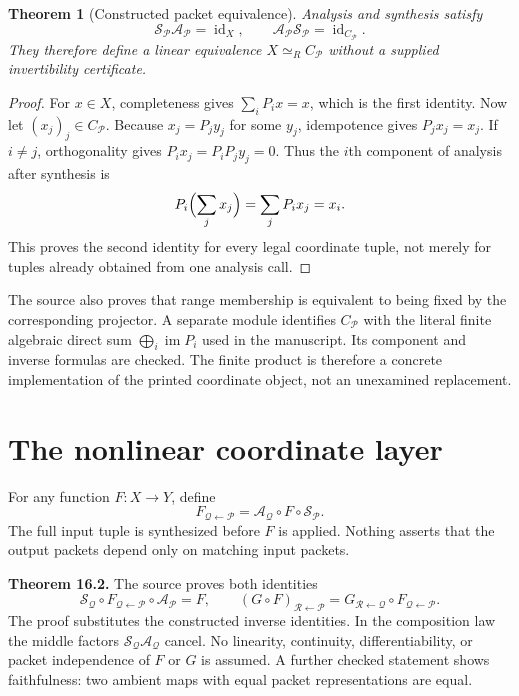\documentclass[11pt]{article}
\newtheorem{theorem}{Theorem}
\newcommand{\A}{\mathcal A}\newcommand{\Synthesis}{\mathcal S}
\newcommand{\Pcal}{\mathcal P}\newcommand{\Qcal}{\mathcal Q}\newcommand{\Rcal}{\mathcal R}
\begin{document}
\begin{theorem}[Constructed packet equivalence]
Analysis and synthesis satisfy
\[
 \Synthesis_{\Pcal}\A_{\Pcal}=\operatorname{id}_X,
 \qquad
 \A_{\Pcal}\Synthesis_{\Pcal}=\operatorname{id}_{C_{\Pcal}}.
\]
They therefore define a linear equivalence $X\simeq_R C_{\Pcal}$ without a supplied invertibility certificate.
\end{theorem}
\begin{proof}
For $x\in X$, completeness gives $\sum_iP_ix=x$, which is the first identity. Now let $(x_j)_j\in C_{\Pcal}$. Because $x_j=P_jy_j$ for some $y_j$, idempotence gives $P_jx_j=x_j$. If $i\ne j$, orthogonality gives $P_ix_j=P_iP_jy_j=0$. Thus the $i$th component of analysis after synthesis is
\[
 P_i\Bigl(\sum_jx_j\Bigr)=\sum_jP_ix_j=x_i.
\]
This proves the second identity for every legal coordinate tuple, not merely for tuples already obtained from one analysis call.
\end{proof}

The source also proves that range membership is equivalent to being fixed by the corresponding projector. A separate module identifies $C_{\Pcal}$ with the literal finite algebraic direct sum $\bigoplus_i\operatorname{im}P_i$ used in the manuscript. Its component and inverse formulas are checked. The finite product is therefore a concrete implementation of the printed coordinate object, not an unexamined replacement.

\section{The nonlinear coordinate layer}
For any function $F\colon X\to Y$, define
\[
 F_{\Qcal\leftarrow\Pcal}=\A_{\Qcal}\circ F\circ\Synthesis_{\Pcal}.
\]
The full input tuple is synthesized before $F$ is applied. Nothing asserts that the output packets depend only on matching input packets.

\textbf{Theorem 16.2.} The source proves both identities
\[
 \Synthesis_{\Qcal}\circ F_{\Qcal\leftarrow\Pcal}\circ\A_{\Pcal}=F,
 \qquad
 (G\circ F)_{\Rcal\leftarrow\Pcal}
 =G_{\Rcal\leftarrow\Qcal}\circ F_{\Qcal\leftarrow\Pcal}.
\]
The proof substitutes the constructed inverse identities. In the composition law the middle factors $\Synthesis_{\Qcal}\A_{\Qcal}$ cancel. No linearity, continuity, differentiability, or packet independence of $F$ or $G$ is assumed. A further checked statement shows faithfulness: two ambient maps with equal packet representations are equal.
\end{document}
